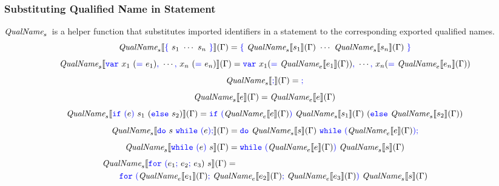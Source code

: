 \documentclass[a4paper]{article}
\newcommand{\code}[1]{\textcolor{blue}{\tt #1}}
\newcommand{\QualName}{\emph{QualName}}
\begin{document}
\subsubsection{Substituting Qualified Name in Statement}
$\QualName_s$\ is a helper function that substitutes imported identifiers in a statement to the corresponding exported qualified names.
\begin{equation*}
\QualName_s \llbracket \code{\{}\ s_1\ \cdots\ s_n\ \code{\}} \rrbracket (\Gamma) = \code{\{}\ \QualName_s \llbracket s_1 \rrbracket (\Gamma)\ \cdots\ \QualName_s \llbracket s_n \rrbracket (\Gamma)\ \code{\}}
\end{equation*}
\begin{equation*}
\QualName_s \llbracket \code{var}\ x_1\ (\code{=}\ e_1)\code{,}\ \cdots\code{,}\ x_n\ (\code{=}\ e_n) \rrbracket (\Gamma) = \code{var}\ x_1(\code{=}\ \QualName_e \llbracket e_1 \rrbracket (\Gamma))\code{,}\ \cdots\code{,}\ x_n(\code{=}\ \QualName_e \llbracket e_n \rrbracket (\Gamma))
\end{equation*}
\begin{equation*}
\QualName_s \llbracket \code{;} \rrbracket (\Gamma) = \code{;}
\end{equation*}
\begin{equation*}
\QualName_s \llbracket e \rrbracket (\Gamma) = \QualName_e \llbracket e \rrbracket (\Gamma)
\end{equation*}
\begin{equation*}
\QualName_s \llbracket \code{if}\ \code{(}e\code{)}\ s_1\ (\code{else}\ s_2) \rrbracket (\Gamma) = \code{if}\ \code{(}\QualName_e \llbracket e \rrbracket (\Gamma)\code{)}\ \QualName_s \llbracket s_1 \rrbracket (\Gamma)\ (\code{else}\ \QualName_s \llbracket s_2 \rrbracket (\Gamma))
\end{equation*}
\begin{equation*}
\QualName_s \llbracket \code{do}\ s\ \code{while}\ \code{(}e\code{);} \rrbracket (\Gamma) = \code{do}\ \QualName_s \llbracket s \rrbracket (\Gamma)\ \code{while}\ \code{(}\QualName_e \llbracket e \rrbracket (\Gamma)\code{);}
\end{equation*}
\begin{equation*}
\QualName_s \llbracket \code{while}\ \code{(}e\code{)}\ s \rrbracket (\Gamma) = \code{while}\ \code{(}\QualName_e \llbracket e \rrbracket (\Gamma)\code{)}\ \QualName_s \llbracket s \rrbracket (\Gamma)
\end{equation*}
\begin{equation*}
\begin{split}
&\QualName_s \llbracket \code{for}\ \code{(}e_1\code{;}\ e_2\code{;}\ e_3)\ s \rrbracket (\Gamma) = \\
&\qquad\code{for}\ \code{(}\QualName_e \llbracket e_1 \rrbracket (\Gamma)\code{;}\ \QualName_e \llbracket e_2 \rrbracket (\Gamma)\code{;}\ \QualName_e \llbracket e_3 \rrbracket (\Gamma)\code{)}\ \QualName_s \llbracket s \rrbracket (\Gamma)
\end{split}
\end{equation*}
\end{document}

